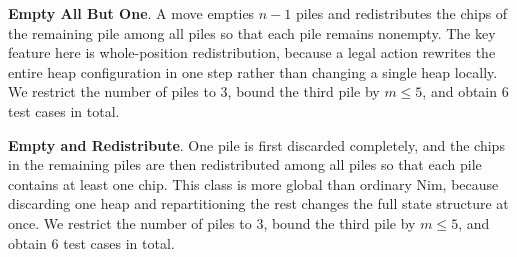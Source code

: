 \documentclass[review]{elsarticle}
\newcommand{\set}[1]{\{ #1 \}}
\newcommand{\tuple}[1]{\langle {#1} \rangle}
\newcommand{\true}{\top}
\newcommand{\statevar}{\mathcal{X}}
\newcommand{\act}{\mathcal{A}}
\newcommand{\constraint}{\mathcal{C}}
\newcommand{\estate}{\mathcal{E}}
\newcommand{\pre}{\mathtt{pre}}
\newcommand{\eff}{\mathtt{eff}}
\begin{document}
{\color{red}\textbf{Empty All But One}. A move empties $n-1$ piles and redistributes the chips of the remaining pile among all piles so that each pile remains nonempty.}
{\color{red}The key feature here is whole-position redistribution, because a legal action rewrites the entire heap configuration in one step rather than changing a single heap locally.}
{\color{red}We restrict the number of piles to $3$, bound the third pile by $m \le 5$, and obtain $6$ test cases in total.}

{\color{red}\textbf{Empty and Redistribute}. One pile is first discarded completely, and the chips in the remaining piles are then redistributed among all piles so that each pile contains at least one chip.}
{\color{red}This class is more global than ordinary Nim, because discarding one heap and repartitioning the rest changes the full state structure at once.}
{\color{red}We restrict the number of piles to $3$, bound the third pile by $m \le 5$, and obtain $6$ test cases in total.}
\end{document}
